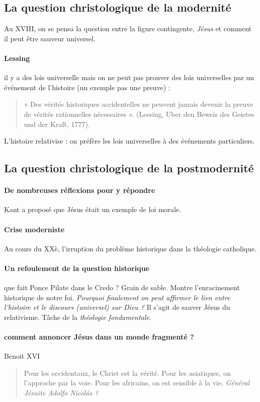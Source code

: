 \subsection{La question christologique de la modernité} Au XVIII, on se pensa la question entre la figure contingente, \textit{Jésus} et comment il peut être sauveur universel.

\paragraph{Lessing } il y a des lois universelle mais on ne peut pas prouver des lois universelles par un événement de l'histoire (un exemple pas une preuve) : 
\begin{quote}
    « Des vérités historiques accidentelles ne peuvent jamais devenir la preuve de vérités
rationnelles nécessaires ». (Lessing, Uber den Beweis des Geistes und der Kraft, 1777).
\end{quote}

L'histoire relativise : on préfère les lois universelles à des événements particuliers. 




\subsection{La question christologique de la postmodernité}

 
\paragraph{De nombreuses réflexions pour y répondre} Kant a proposé que Jésus était un exemple de loi morale. 
\paragraph{Crise moderniste} Au cours du XXè, l'irruption du problème historique dans la théologie catholique.

\paragraph{Un refoulement de la question historique} que fait Ponce Pilate dans le Credo ? Grain de sable. Montre l'enracinement historique de notre foi. \textit{Pourquoi finalement on peut affirmer le lien entre l'histoire et le discours (universel) sur Dieu ?} Il s'agit de sauver Jésus du relativisme. Tâche de la \textit{théologie fondamentale}.

\paragraph{comment annoncer Jésus dans un monde fragmenté ? } Benoit XVI
\begin{quote}
    Pour les occidentaux, le Christ est la vérité.
    Pour les asiatiques, on l'approche par la voie.
    Pour les africains, on est sensible à la vie. 
    \textit{Général Jésuite Adolfo Nicolás ?}
\end{quote}

